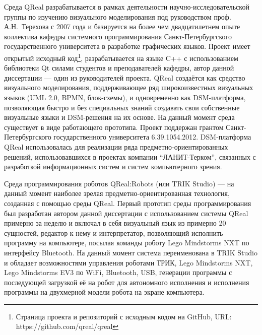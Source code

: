 Среда QReal разрабатывается в рамках деятельности научно-исследовательской 
группы по изучению визуального моделирования под руководством проф. 
А.Н.~Терехова с 2007 года и базируется на более чем двадцатилетнем опыте 
коллектива кафедры системного программирования Санкт-Петербургского 
государственного университета в разработке графических языков. 
Проект имеет открытый исходный код\footnote{Страница проекта и репозиторий с исходным кодом на GitHub, URL: https://github.com/qreal/qreal}, 
разрабатывается на языке C++ с использованием библиотеки Qt силами студентов и преподавателей кафедры, автор 
данной диссертации --- один из руководителей проекта. QReal создаётся как 
средство визуального моделирования, поддерживающее ряд широкоизвестных 
визуальных языков (UML 2.0, BPMN, блок-схемы), и одновременно как DSM-платформа, 
позволяющая быстро и без специальных знаний создавать свои собственные 
визуальные языки и DSM-решения на их основе. На данный момент среда существует 
в виде работающего прототипа. Проект поддержан грантом Санкт-Петербургского 
государственного университета 6.39.1054.2012. DSM-платформа QReal использовалась
 для реализации ряда предметно-ориентированных решений, использовавшихся в 
проектах компании "`ЛАНИТ-Терком"', связанных с разработкой информационных систем 
и систем компьютерного зрения.

Среда программирования роботов QReal:Robots (или TRIK Studio) --- на данный момент наиболее зрелая 
предметно-ориентированная технология, созданная с помощью среды QReal. 
Первый прототип среды программирования был разработан автором данной диссертации
с использованием системы QReal примерно за неделю и включал в себя визуальный 
язык из примерно 20 сущностей, редактор к нему и интерпретатор, позволяющий 
исполнить программу на компьютере, посылая команды роботу Lego Mindstorms NXT по интерфейсу 
Bluetooth. На данный момент система переименована в TRIK Studio и обладает возможностями управления роботами 
ТРИК, Lego Mindstorms NXT, Lego Mindstorms EV3 по WiFi, Bluetooth, USB, генерации программы с 
последующей загрузкой её на робот для автономного исполнения и исполнения 
программы на двухмерной модели робота на экране компьютера.

